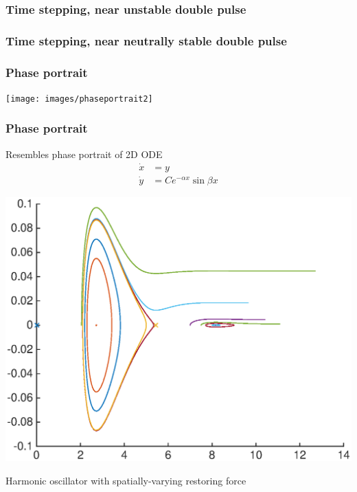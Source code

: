 \documentclass[16pt]{beamer}
\begin{document}
\begin{frame}
	\frametitle{Time stepping, near unstable double pulse}
	\fontsize{16}{7.2}\selectfont
	\begin{center}
	\end{center}
\end{frame}

\begin{frame}
	\frametitle{Time stepping, near neutrally stable double pulse}
	\fontsize{16}{7.2}\selectfont
	\begin{center}
	\end{center}
\end{frame}

\begin{frame}
	\frametitle{Phase portrait}
	\fontsize{16}{7.2}\selectfont
	\begin{center}
	\texttt{[image: images/phaseportrait2]}
	\end{center}
\end{frame}

\begin{frame}
	\frametitle{Phase portrait}
	\fontsize{16}{7.2}\selectfont
	Resembles phase portrait of 2D ODE
	\begin{align*}
	\dot{x} &= y \\
	\dot{y} &= C e^{-\alpha x} \sin \beta x
	\end{align*}
	\begin{center}
	\includegraphics[width=0.5\linewidth]{images/simplephaseportrait}
	\end{center}
	Harmonic oscillator with spatially-varying restoring force
\end{frame}
\end{document}
